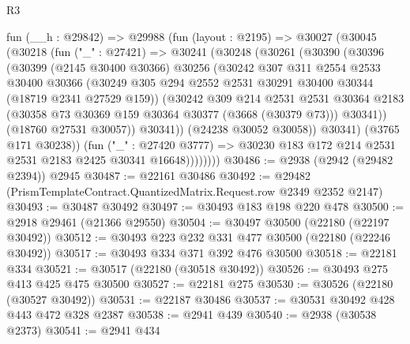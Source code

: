 \begin{lexlean}{R3}
\begin{coremodule}
          fun (__h : @29842) =>
          @29988
            (fun (layout : @2195) =>
            @30027
              (@30045
                (@30218
                  (fun ("_" : @27421) =>
                  @30241
                    (@30248
                      (@30261
                        (@30390
                          (@30396
                            (@30399
                              (@2145 @30400 @30366)
                              @30256
                              (@30242
                                @307
                                @311
                                @2554
                                @2533
                                @30400
                                @30366
                                (@30249
                                  @305
                                  @294
                                  @2552
                                  @2531
                                  @30291
                                  @30400
                                  @30344
                                  (@18719 @2341 @27529 @159))
                                (@30242
                                  @309
                                  @214
                                  @2531
                                  @2531
                                  @30364
                                  @2183
                                  (@30358 @73 @30369 @159 @30364 @30377 (@3668 (@30379 @73)))
                                  @30341))
                              (@18760 @27531 @30057))
                            @30341))
                        (@24238 @30052 @30058))
                      @30341)
                    (@3765 @171 @30238))
                  (fun ("_" : @27420 @3777) =>
                  @30230 @183 @172 @214 @2531 @2531 @2183 @2425 @30341 @16648))))))))
@30486 := @2938 (@2942 (@29482 @2394)) @2945
@30487 := @22161 @30486
@30492 := @29482 (PrismTemplateContract.QuantizedMatrix.Request.row @2349 @2352 @2147)
@30493 := @30487 @30492
@30497 := @30493 @183 @198 @220 @478
@30500 := @2918 @29461 (@21366 @29550)
@30504 := @30497 @30500 (@22180 (@22197 @30492))
@30512 := @30493 @223 @232 @331 @477 @30500 (@22180 (@22246 @30492))
@30517 := @30493 @334 @371 @392 @476 @30500
@30518 := @22181 @334
@30521 := @30517 (@22180 (@30518 @30492))
@30526 := @30493 @275 @413 @425 @475 @30500
@30527 := @22181 @275
@30530 := @30526 (@22180 (@30527 @30492))
@30531 := @22187 @30486
@30537 := @30531 @30492 @428 @443 @472 @328 @2387
@30538 := @2941 @439
@30540 := @2938 (@30538 @2373)
@30541 := @2941 @434

\end{coremodule}
\end{lexlean}
